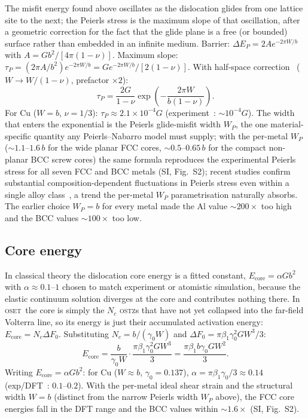 \documentclass[3p]{elsarticle}
\newcommand{\OSTZ}{\textsc{ostz}}
\newcommand{\OSET}{\textsc{oset}}
\newcommand{\dF}{\Delta F_0}
\newcommand{\gz}{\gamma_0}
\begin{document}
The misfit energy found above oscillates as the dislocation glides
from one lattice site to the next; the Peierls stress is the
maximum slope of that oscillation, after a geometric correction for
the fact that the glide plane is a free (or bounded) surface rather
than embedded in an infinite medium.
Barrier: $\Delta E_P=2Ae^{-2\pi W/b}$ with $A=Gb^2/[4\pi(1-\nu)]$.
Maximum slope: $\tau_P=(2\pi A/b^2)e^{-2\pi W/b}=G e^{-2\pi W/b}/[2(1-\nu)]$.
With half-space correction~\citep{peierls1940} ($W\to W/(1-\nu)$, prefactor $\times2$):
\begin{equation}
  \boxed{\tau_P=\frac{2G}{1-\nu}
  \exp\!\left(-\frac{2\pi W}{b(1-\nu)}\right).}
  \label{eq:peierls}
\end{equation}
For Cu ($W=b$, $\nu=1/3$): $\tau_P\approx2.1\times10^{-4}G$
(experiment~\citep{nabarro1997}: $\sim10^{-4}G$). The width that enters
the exponential is the Peierls glide-misfit width $W_P$, the one
material-specific quantity any Peierls--Nabarro model must supply; with
the per-metal $W_P$ ($\sim1.1$--$1.6\,b$ for the wide planar FCC cores,
$\sim0.5$--$0.65\,b$ for the compact non-planar BCC screw cores) the same
formula reproduces the experimental Peierls stress for all seven FCC and
BCC metals (SI, Fig.~S2); recent studies confirm substantial
composition-dependent fluctuations in Peierls stress even within a single
alloy class~\citep{liu2026peierls}, a trend the per-metal $W_P$
parametrisation naturally absorbs. The earlier choice $W_P=b$ for every metal made
the Al value $\sim200\times$ too high and the BCC values $\sim100\times$
too low.

\subsection{Core energy}
\label{sec:coreE}

In classical theory the dislocation core energy is a fitted
constant, $E_\text{core}=\alpha Gb^2$ with $\alpha\approx0.1$--$1$
chosen to match experiment or atomistic simulation, because the
elastic continuum solution diverges at the core and contributes
nothing there. In \OSET\ the core is simply the $N_c$ \OSTZ s that
have not yet collapsed into the far-field Volterra line, so its
energy is just their accumulated activation energy:
$E_\text{core}=N_c\dF$. Substituting $N_c=b/(\gz W)$ and
$\dF=\pi\beta_1\gz^2GW^3/3$:
\begin{equation}
  \boxed{E_\text{core}=\frac{b}{\gz W}\cdot\frac{\pi\beta_1\gz^2GW^3}{3}
  =\frac{\pi\beta_1 b\gz GW^2}{3}.}
  \label{eq:coreE}
\end{equation}
Writing $E_\text{core}=\alpha Gb^2$: for Cu ($W\approx b$, $\gz=0.137$),
$\alpha=\pi\beta_1\gz/3\approx0.14$ (exp/DFT~\citep{woodward2002}: $0.1$--$0.2$).
With the per-metal ideal shear strain and the structural width $W=b$
(distinct from the narrow Peierls width $W_P$ above), the FCC core
energies fall in the DFT range and the BCC values within $\sim1.6\times$
(SI, Fig.~S2).
\end{document}
